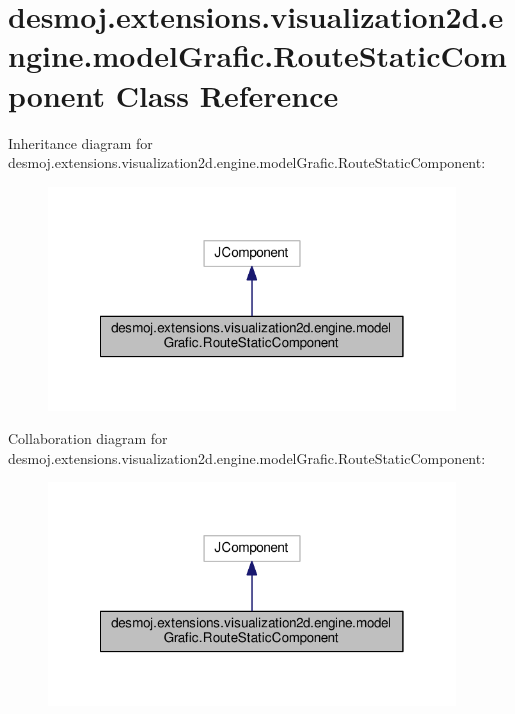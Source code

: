 \section{desmoj.\-extensions.\-visualization2d.\-engine.\-model\-Grafic.\-Route\-Static\-Component Class Reference}
\label{classdesmoj_1_1extensions_1_1visualization2d_1_1engine_1_1model_grafic_1_1_route_static_component}


Inheritance diagram for desmoj.\-extensions.\-visualization2d.\-engine.\-model\-Grafic.\-Route\-Static\-Component\-:
\nopagebreak
\begin{figure}[H]
\begin{center}
\leavevmode
\includegraphics[width=306pt]{classdesmoj_1_1extensions_1_1visualization2d_1_1engine_1_1model_grafic_1_1_route_static_component__inherit__graph}
\end{center}
\end{figure}


Collaboration diagram for desmoj.\-extensions.\-visualization2d.\-engine.\-model\-Grafic.\-Route\-Static\-Component\-:
\nopagebreak
\begin{figure}[H]
\begin{center}
\leavevmode
\includegraphics[width=306pt]{classdesmoj_1_1extensions_1_1visualization2d_1_1engine_1_1model_grafic_1_1_route_static_component__coll__graph}
\end{center}
\end{figure}
